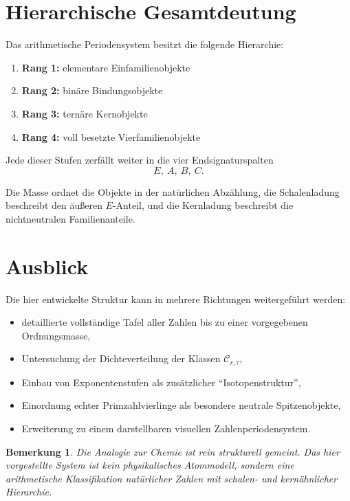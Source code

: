 \documentclass[12pt,a4paper]{article}
\newtheorem{bemerkung}[satz]{Bemerkung}
\begin{document}
	\section{Hierarchische Gesamtdeutung}
	
	Das arithmetische Periodensystem besitzt die folgende Hierarchie:
	
	\begin{enumerate}
		\item \textbf{Rang 1:} elementare Einfamilienobjekte
		\item \textbf{Rang 2:} binäre Bindungsobjekte
		\item \textbf{Rang 3:} ternäre Kernobjekte
		\item \textbf{Rang 4:} voll besetzte Vierfamilienobjekte
	\end{enumerate}
	
	Jede dieser Stufen zerfällt weiter in die vier Endsignaturspalten
	\[
	E,\ A,\ B,\ C.
	\]
	
	Die Masse ordnet die Objekte in der natürlichen Abzählung, die Schalenladung beschreibt den äußeren $E$-Anteil, und die Kernladung beschreibt die nichtneutralen Familienanteile.
	
	\section{Ausblick}
	
	Die hier entwickelte Struktur kann in mehrere Richtungen weitergeführt werden:
	
	\begin{itemize}
		\item detaillierte vollständige Tafel aller Zahlen bis zu einer vorgegebenen Ordnungsmasse,
		\item Untersuchung der Dichteverteilung der Klassen $\mathcal C_{r,\tau}$,
		\item Einbau von Exponentenstufen als zusätzlicher ``Isotopenstruktur'',
		\item Einordnung echter Primzahlvierlinge als besondere neutrale Spitzenobjekte,
		\item Erweiterung zu einem darstellbaren visuellen Zahlenperiodensystem.
	\end{itemize}
	
	\begin{bemerkung}
		Die Analogie zur Chemie ist rein strukturell gemeint. Das hier vorgestellte System ist kein physikalisches Atommodell, sondern eine arithmetische Klassifikation natürlicher Zahlen mit schalen- und kernähnlicher Hierarchie.
	\end{bemerkung}
	
\end{document}
